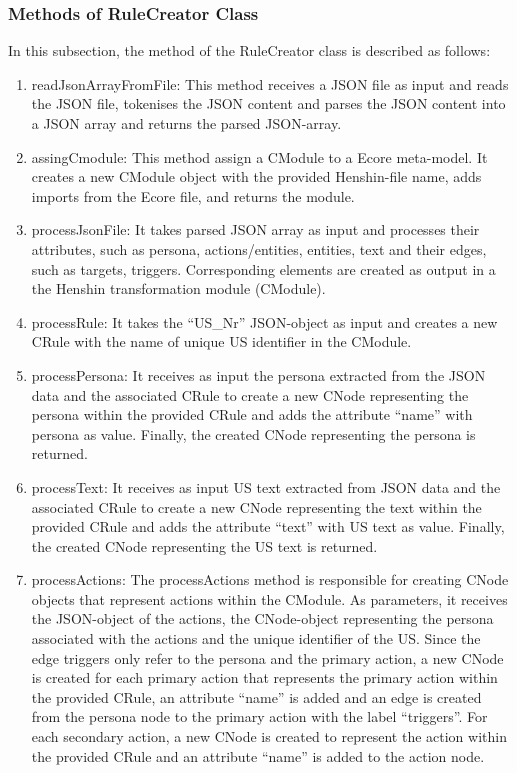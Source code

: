 \subsubsection*{Methods of RuleCreator Class}
In this subsection, the method of the RuleCreator class is described as follows:
\begin{enumerate}
	\item readJsonArrayFromFile: This method receives a JSON file as input and reads the JSON file, tokenises the JSON content and parses the JSON content into a JSON array and returns the parsed JSON-array.
	\item assingCmodule: This method assign a CModule to a Ecore meta-model. It creates a new CModule object with the provided Henshin-file name, adds imports from the Ecore file, and returns the module.
	\item processJsonFile: It takes parsed JSON array as input and processes their attributes, such as persona, actions/entities, entities, text and their edges, such as targets, triggers. Corresponding elements are created as output in a the Henshin transformation module (CModule).
	\item processRule: It takes the \enquote{US\_Nr} JSON-object as input and creates a new CRule with the name of unique US identifier in the CModule.
	\item processPersona: It receives as input the persona extracted from the JSON data and the associated CRule to create a new CNode representing the persona within the provided CRule and adds the attribute \enquote{name} with persona as value. Finally, the created CNode representing the persona is returned.
	\item processText: It receives as input US text extracted from JSON data and the associated CRule to create a new CNode representing the text within the provided CRule and adds the attribute \enquote{text} with US text as value. Finally, the created CNode representing the US text is returned.
	\item processActions: The processActions method is responsible for creating CNode objects that represent actions within the CModule. As parameters, it receives the JSON-object of the actions, the CNode-object representing the persona associated with the actions and the unique identifier of the US. Since the edge triggers only refer to the persona and the primary action, a new CNode is created for each primary action that represents the primary action within the provided CRule, an attribute \enquote{name} is added and an edge is created from the persona node to the primary action with the label \enquote{triggers}. For each secondary action, a new CNode is created to represent the action within the provided CRule and an attribute \enquote{name} is added to the action node.

\end{enumerate}
